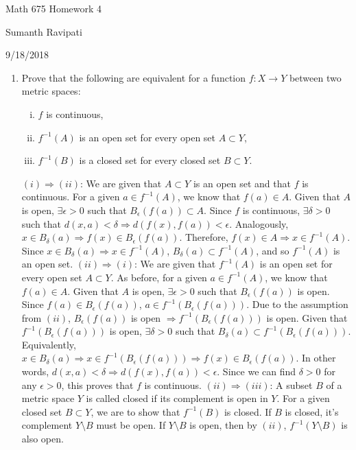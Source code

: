 \documentclass[12pt,letterpaper,reqno]{amsart}
\begin{document}
\thispagestyle{empty}
\centerline{\Large Math 675 Homework 4}
\centerline{Sumanth Ravipati}
\centerline{9/18/2018}
\vspace{.15in}
\begin{enumerate}[1.]
\item Prove that the following are equivalent for a function $f: X\rightarrow Y$ between two metric spaces:
\begin{enumerate}[(i)]
\item $f$ is continuous,
\item $f^{-1}(A)$ is an open set for every open set $A\subset Y$,
\item $f^{-1}(B)$ is a closed set for every closed set $B\subset Y$.
\end{enumerate}
\begin{flushleft}
$(i) \Rightarrow (ii)$: We are given that $A \subset Y$ is an open set and that $f$ is continuous. For a given $a \in f^{-1}(A)$, we know that $f(a) \in A$. Given that $A$ is open, $\exists \epsilon > 0$ such that $B_\epsilon(f(a)) \subset A$. Since $f$ is continuous, $\exists \delta > 0$ such that $d(x,a) < \delta \Rightarrow d(f(x),f(a)) < \epsilon$. Analogously, $x \in B_\delta(a) \Rightarrow f(x) \in B_\epsilon(f(a))$. Therefore, $f(x) \in A \Rightarrow x \in f^{-1}(A)$. Since $x \in B_\delta(a) \Rightarrow x \in f^{-1}(A)$, $B_\delta(a) \subset f^{-1}(A)$, and so $f^{-1}(A)$ is an open set. \newline
$(ii) \Rightarrow (i)$: We are given that $f^{-1}(A)$ is an open set for every open set $A\subset Y$. As before, for a given $a \in f^{-1}(A)$, we know that $f(a) \in A$. Given that $A$ is open, $\exists \epsilon > 0$ such that $B_\epsilon(f(a))$ is open. Since $f(a) \in B_\epsilon(f(a))$, $a \in f^{-1}(B_\epsilon(f(a)))$. Due to the assumption from $(ii)$, $B_\epsilon(f(a))$ is open $\Rightarrow f^{-1}(B_\epsilon(f(a)))$ is open. Given that $ f^{-1}(B_\epsilon(f(a)))$ is open, $\exists \delta > 0$ such that $B_\delta(a) \subset f^{-1}(B_\epsilon(f(a)))$. Equivalently, $x \in B_\delta(a) \Rightarrow x \in f^{-1}(B_\epsilon(f(a))) \Rightarrow f(x) \in B_\epsilon(f(a))$. In other words, $d(x,a) < \delta \Rightarrow d(f(x),f(a)) < \epsilon$. Since we can find $\delta > 0$ for any $\epsilon > 0$, this proves that $f$ is continuous. \newline
$(ii) \Rightarrow (iii)$: A subset $B$ of a metric space $Y$ is called closed if its complement is open in $Y$. For a given closed set $B \subset Y$, we are to show that $f^{-1}(B)$ is closed. If $B$ is closed, it's complement $Y \setminus B$ must be open. If $Y \setminus B$ is open, then by $(ii)$, $f^{-1}(Y \setminus B)$ is also open. \newline

\end{flushleft}
\end{enumerate}
\end{document}
